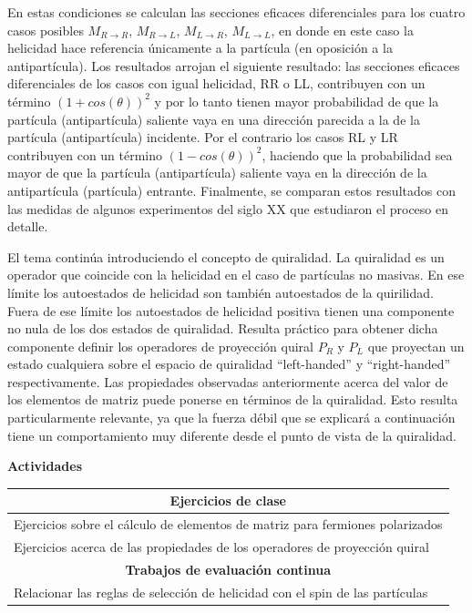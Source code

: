 En estas condiciones se calculan las secciones eficaces diferenciales para los cuatro casos posibles $M_{R\rightarrow R}$, $M_{R\rightarrow L}$, $M_{L\rightarrow R}$, $M_{L\rightarrow L}$, en donde en este caso la helicidad hace referencia únicamente a la partícula (en oposición a la antipartícula). Los resultados arrojan el siguiente resultado: las secciones eficaces diferenciales de los casos con igual helicidad, RR o LL, contribuyen con un término $(1 + cos(\theta))^2$ y por lo tanto tienen mayor probabilidad de que la partícula (antipartícula) saliente vaya en una dirección parecida a la de la partícula (antipartícula) incidente. Por el contrario los casos RL y LR contribuyen con un término $(1 - cos(\theta))^2$, haciendo que la probabilidad sea mayor de que la partícula (antipartícula) saliente vaya en la dirección de la antipartícula (partícula) entrante. Finalmente, se comparan estos resultados con las medidas de algunos experimentos del siglo XX que estudiaron el proceso en detalle.

El tema continúa introduciendo el concepto de quiralidad. La quiralidad es un operador que coincide con la helicidad en el caso de partículas no masivas. En ese límite los autoestados de helicidad son también autoestados de la quirilidad. Fuera de ese límite los autoestados de helicidad positiva tienen una componente no nula de los dos estados de quiralidad. Resulta práctico para obtener dicha componente definir los operadores de proyección quiral $P_R$ y $P_L$ que proyectan un estado cualquiera sobre el espacio de quiralidad ``left-handed'' y ``right-handed'' respectivamente. Las propiedades observadas anteriormente acerca del valor de los elementos de matriz puede ponerse en términos de la quiralidad. Esto resulta particularmente relevante, ya que la fuerza débil que se explicará a continuación tiene un comportamiento muy diferente desde el punto de vista de la quiralidad.

\textbf{Actividades}

\begin{center}
\begin{tabularx}{\textwidth}{|X|}
\hline\hline
\multicolumn{1}{|c|}{\textbf{Ejercicios de clase}}\\
\hline\hline
Ejercicios sobre el cálculo de elementos de matriz para fermiones polarizados \\
\hline
Ejercicios acerca de las propiedades de los operadores de proyección quiral \\
\hline\hline
\multicolumn{1}{|c|}{\textbf{Trabajos de evaluación continua}}\\
\hline\hline
Relacionar las reglas de selección de helicidad con el spin de las partículas \\
\hline\hline
\end{tabularx}
\end{center}

